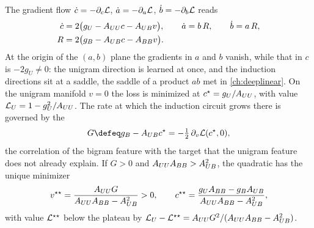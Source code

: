 \begin{refsection}
The gradient flow $\dot c=-\partial_c\mathcal{L}$, $\dot a=-\partial_a\mathcal{L}$, $\dot b=-\partial_b\mathcal{L}$ reads
\begin{equation}\label{eq:induction:flow}
  \begin{aligned}
  \dot c&=2\bigl(g_U-A_{UU} c-A_{UB} v\bigr),\qquad \dot a=b\,R,\qquad \dot b=a\,R,\\
  R&=2\bigl(g_B-A_{UB} c-A_{BB} v\bigr).
  \end{aligned}
\end{equation}
At the origin of the $(a,b)$ plane the gradients in $a$ and $b$ vanish, while that in $c$ is $-2g_U\ne0$: the unigram direction is learned at once, and the induction directions sit at a saddle, the saddle of a product $ab$ met in \cref{ch:deeplinear}. On the unigram manifold $v=0$ the loss is minimized at $c^\star=g_U/A_{UU}$, with value $\mathcal{L}_{U}=1-g_U^2/A_{UU}$. The rate at which the induction circuit grows there is governed by the 
\begin{equation}\label{eq:induction:gain}
  G\defeq g_B-\indAX c^\star=-\tfrac12\,\partial_v\Loss(c^\star,0),
\end{equation}
the correlation of the bigram feature with the target that the unigram feature does not already explain. If $G>0$ and $A_{UU}A_{BB}>A_{UB}^2$, the quadratic has the unique minimizer
\[
  v^{\star\star}=\frac{A_{UU} G}{A_{UU}A_{BB}-A_{UB}^2}>0,\qquad c^{\star\star}=\frac{g_UA_{BB}-g_BA_{UB}}{A_{UU}A_{BB}-A_{UB}^2},
\]
with value $\mathcal{L}^{\star\star}$ below the plateau by $\mathcal{L}_{U}-\mathcal{L}^{\star\star}=A_{UU} G^2/(A_{UU}A_{BB}-A_{UB}^2)$.



\end{refsection}
